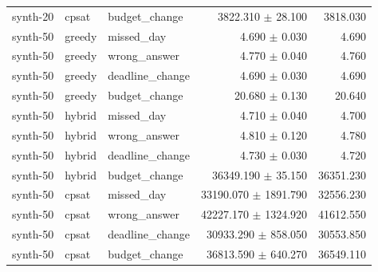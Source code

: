 \begin{table}[htbp]
\begin{tabular}{lllrr}
synth-20 & cpsat & budget\_change & 3822.310 $\pm$ 28.100 & 3818.030 \\
synth-50 & greedy & missed\_day & 4.690 $\pm$ 0.030 & 4.690 \\
synth-50 & greedy & wrong\_answer & 4.770 $\pm$ 0.040 & 4.760 \\
synth-50 & greedy & deadline\_change & 4.690 $\pm$ 0.030 & 4.690 \\
synth-50 & greedy & budget\_change & 20.680 $\pm$ 0.130 & 20.640 \\
synth-50 & hybrid & missed\_day & 4.710 $\pm$ 0.040 & 4.700 \\
synth-50 & hybrid & wrong\_answer & 4.810 $\pm$ 0.120 & 4.780 \\
synth-50 & hybrid & deadline\_change & 4.730 $\pm$ 0.030 & 4.720 \\
synth-50 & hybrid & budget\_change & 36349.190 $\pm$ 35.150 & 36351.230 \\
synth-50 & cpsat & missed\_day & 33190.070 $\pm$ 1891.790 & 32556.230 \\
synth-50 & cpsat & wrong\_answer & 42227.170 $\pm$ 1324.920 & 41612.550 \\
synth-50 & cpsat & deadline\_change & 30933.290 $\pm$ 858.050 & 30553.850 \\
synth-50 & cpsat & budget\_change & 36813.590 $\pm$ 640.270 & 36549.110 \\
\bottomrule
\end{tabular}
\end{table}
